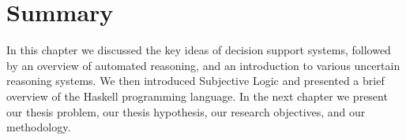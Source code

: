 \documentclass[thesis.tex]{subfiles}
\begin{document}
\section{Summary}

In this chapter we discussed the key ideas of decision support
systems, followed by an overview of automated reasoning, and an
introduction to various uncertain reasoning systems. We then introduced Subjective
Logic and presented a brief overview of the Haskell programming
language. In the next chapter we present our thesis problem,
our thesis hypothesis, our research objectives, and our methodology.
\end{document}
